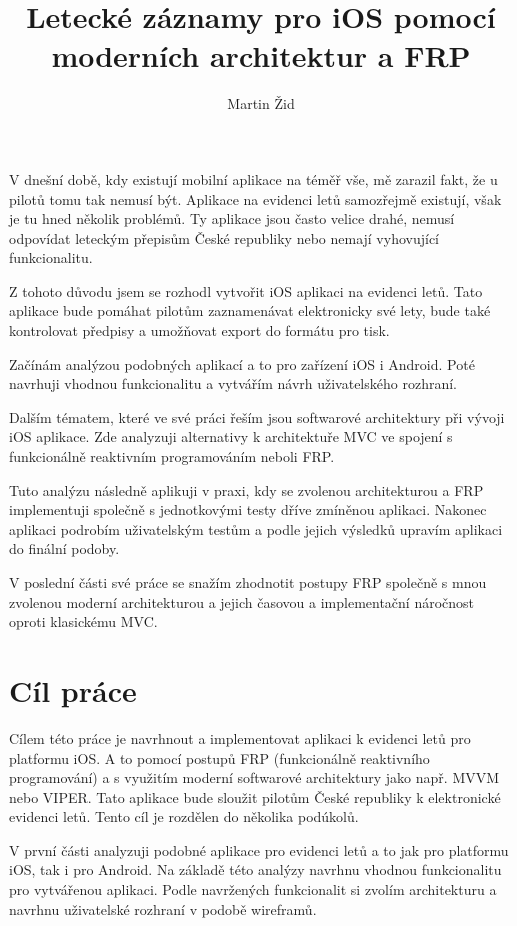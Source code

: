 \documentclass[thesis=M,czech]{FITthesis}[2012/06/26]
\title{Letecké záznamy pro iOS pomocí moderních architektur a FRP}
\author{Martin Žid} %
\begin{document}

\begin{introduction}
V dnešní době, kdy existují mobilní aplikace na téměř vše, mě zarazil fakt, že u pilotů tomu tak nemusí být. Aplikace na evidenci letů samozřejmě existují, však je tu hned několik problémů. Ty aplikace jsou často velice drahé, nemusí odpovídat leteckým přepisům České republiky nebo nemají vyhovující funkcionalitu.

Z tohoto důvodu jsem se rozhodl vytvořit iOS aplikaci na evidenci letů. Tato aplikace bude pomáhat pilotům zaznamenávat elektronicky své lety, bude také kontrolovat předpisy a umožňovat export do formátu pro tisk.

Začínám analýzou podobných aplikací a to pro zařízení iOS i Android. Poté navrhuji vhodnou funkcionalitu a vytvářím návrh uživatelského rozhraní.

Dalším tématem, které ve své práci řeším jsou softwarové architektury při vývoji iOS aplikace. Zde analyzuji alternativy k architektuře MVC ve spojení s funkcionálně reaktivním programováním neboli FRP.

Tuto analýzu následně aplikuji v praxi, kdy se zvolenou architekturou a FRP implementuji společně s jednotkovými testy dříve zmíněnou aplikaci. Nakonec aplikaci podrobím uživatelským testům a podle jejich výsledků
upravím aplikaci do finální podoby.

V poslední části své práce se snažím zhodnotit postupy FRP společně s mnou zvolenou moderní architekturou a jejich časovou a implementační náročnost oproti klasickému MVC.
\end{introduction}

\chapter{Cíl práce}
Cílem této práce je navrhnout a implementovat aplikaci k evidenci letů pro platformu iOS. A to pomocí postupů FRP (funkcionálně reaktivního programování) a s využitím moderní softwarové architektury jako např. MVVM nebo VIPER.  Tato aplikace bude sloužit pilotům České republiky k elektronické evidenci letů. Tento cíl je rozdělen do několika podúkolů.

V první části analyzuji podobné aplikace pro evidenci letů a to jak pro platformu iOS, tak i pro Android. Na základě této analýzy navrhnu vhodnou funkcionalitu pro vytvářenou aplikaci. Podle navržených funkcionalit si zvolím architekturu  a navrhnu uživatelské rozhraní v podobě wireframů.
\end{document}
